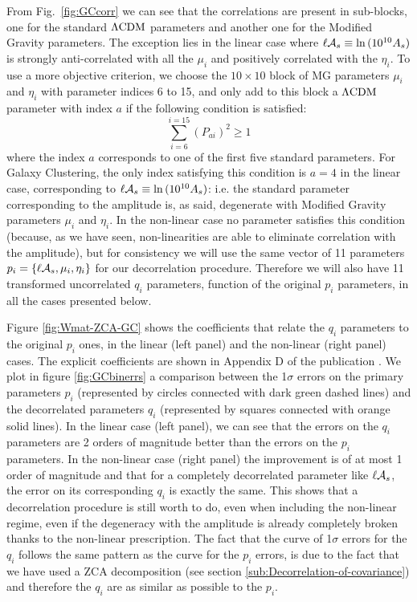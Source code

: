 From Fig.\ \ref{fig:GCcorr} we can see that the correlations are present in sub-blocks, one for 
the standard $\Lambda\mathrm{CDM}$ parameters and another one for the Modified Gravity parameters. The exception lies in the linear case
where $\ell \mathcal{A}_{s} \equiv \ln{(10^{10}A_s)}$ is strongly anti-correlated with all the $\mu_i$ and positively correlated with the $\eta_i$. 
To use a more objective criterion, we choose the $10\times 10$ block of MG parameters $\mu_i$ and $\eta_i$ with parameter indices 6 to 15, and only add to this block a $\Lambda\mathrm{CDM}$ parameter with index $a$
if the following condition is satisfied:
\[
 \sum_{i=6}^{i=15}(P_{ai})^2 \geq 1
\]
where the index $a$ corresponds to one of the first five standard parameters. For Galaxy Clustering, the only index satisfying this condition is $a=4$ in the linear case, corresponding to $\ell \mathcal{A}_{s} \equiv \ln{(10^{10}A_s)}$: i.e. the standard parameter corresponding to the amplitude is, as said, degenerate with Modified Gravity parameters $\mu_i$ and $\eta_i$.
In the non-linear case no parameter satisfies this condition (because, as we have seen, non-linearities are able to eliminate correlation with the amplitude), but for consistency we will use the same vector of 11 parameters
$p_i = \left\{ \ell \mathcal{A}_{s}, \mu_i, \eta_i \right\}$ for our decorrelation procedure.
Therefore we will also have 11 transformed uncorrelated $q_i$ parameters, function of the original $p_i$ parameters, in all the cases presented below. 


Figure \ref{fig:Wmat-ZCA-GC} shows the coefficients that relate the 
$q_i$ parameters to the original $p_i$ ones, in the linear (left panel) and the non-linear (right panel) cases. The explicit coefficients are shown in Appendix D of the publication \cite{casas_linear_2017}.
We plot in figure \ref{fig:GCbinerrs} a comparison between the 1$\sigma$ errors on the primary parameters $p_i$ 
(represented by circles connected with dark green dashed lines) and the decorrelated parameters $q_i$ 
(represented by squares connected with orange solid lines). 
In the linear case (left panel), we can see that the errors on the $q_i$ parameters are 2 orders of magnitude 
better than the errors on the $p_i$ parameters. In the non-linear case (right panel) the improvement is of at most 1 order of magnitude 
and that for a completely decorrelated parameter like $\ell \mathcal{A}_{s}$, 
the error on its corresponding $q_i$ is exactly the same. 
This shows that a decorrelation procedure is still worth to do, even when including the non-linear regime, 
even if the degeneracy with the amplitude is already completely broken thanks to the non-linear prescription.
The fact that the curve of 1$\sigma$ errors for the $q_i$ follows the same pattern as the curve for the $p_i$ errors, 
is due to the fact that we have used a ZCA decomposition 
(see section \ref{sub:Decorrelation-of-covariance}) and therefore the $q_i$ are as similar as possible to the $p_i$.


